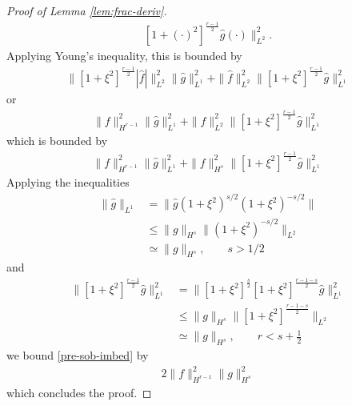 \documentclass[12pt,reqno]{amsart}
\numberwithin{equation}{section}  %
\newcommand{\wh}{\widehat}
\begin{document}
\begin{proof}[Proof of Lemma \ref{lem:frac-deriv}]
\begin{equation*}
\begin{split}
  \left[ 1 + (\cdot)^{2} \right]^{\frac{r-1}{2}} \wh{g}(\cdot)
  \|_{L^{2}}^{2}.
\end{split}
\end{equation*}
%
%
Applying Young's inequality, this is bounded by
%
%
\begin{equation*}
\begin{split}
  \| \left[ 1 + \xi^{2} \right]^{\frac{r-1}{2}} | \wh{f} |
  \|_{L^{2}}^{2} \| \wh{g}\|^{2}_{L^{1}} + \| \wh{f}
  \|^{2}_{L^{2}} \| \left[ 1 + \xi^{2}
  \right]^{\frac{r-1}{2}}\wh{g} \|_{L^{1}}^{2}
\end{split}
\end{equation*}
%
%
or
%
%
\begin{equation*}
\begin{split}
  \| f \|_{H^{r-1}}^{2} \| \wh{g} \|_{L^{1}}^{2} + \| f
  \|_{L^{2}}^{2} \| \left[ 1 + \xi^{2}
  \right]^{\frac{r-1}{2}}\wh{g} \|_{L^{1}}^{2}
\end{split}
\end{equation*}
%
which is bounded by 
\begin{equation}
  \label{pre-sob-imbed}
\begin{split}
  \| f \|_{H^{r-1}}^{2} \| \wh{g} \|_{L^{1}}^{2} + \| f
  \|_{H^{s}}^{2} \| \left[ 1 + \xi^{2}
  \right]^{\frac{r-1}{2}}\wh{g} \|_{L^{1}}^{2}
\end{split}
\end{equation}
%
Applying the inequalities
%
%
\begin{equation*}
\begin{split}
  \| \wh{g} \|_{L^{1}} 
  & = \| \wh{g} (1 + \xi^{2})^{s/2} (1 + \xi^{2})^{-s/2} \|
  \\
  & \le \| g \|_{H^{s}} \| (1 + \xi^{2})^{-s/2} \|_{L^{2}}
  \\
  & \simeq \| g \|_{H^{s}}, \qquad s > 1/2
\end{split}
\end{equation*}
%
%
and
%
%
\begin{equation*}
\begin{split}
\| \left[ 1 + \xi^{2}
  \right]^{\frac{r-1}{2}}\wh{g} \|_{L^{1}}^{2}
  & = \| \left[ 1 + \xi^{2}
  \right]^{\frac{s}{2}} \left[ 1 + \xi^{2}
  \right]^{\frac{r-1 -s}{2}} \wh{g} \|_{L^{1}}^{2}
  \\
  & \le \| g \|_{H^{s}} \| \left[ 1 + \xi^{2} \right]^{\frac{r-1 -s}{2}}
  \|_{L^{2}}
  \\
  & \simeq \| g \|_{H^{s}}, \qquad r < s+\frac{1}{2}
\end{split}
\end{equation*}
%
%
we bound \eqref{pre-sob-imbed} by 
%
%
\begin{equation*}
\begin{split}
  2 \| f \|^{2}_{H^{r-1}} \| g \|_{H^{s}}^{2}
\end{split}
\end{equation*}
%
%
which concludes the proof.
\end{proof}
\end{document}
